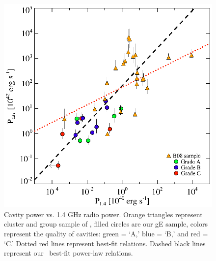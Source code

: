 \documentclass[letterpaper,12pt]{article}
\begin{document}
\begin{figure}[t]
\begin{minipage}[t]{0.5\linewidth}
        \includegraphics*[width=\textwidth, trim=30mm 5mm 40mm 15mm, clip]{pjet.eps}
        \caption{\footnotesize Cavity power vs. 1.4 GHz radio
          power. Orange triangles represent cluster and group sample
          of \cite{birzan08}, filled circles are our gE sample, colors
          represent the quality of cavities: green = `A,' blue = `B,'
          and red = `C.' Dotted red lines represent \cite{birzan08}
          best-fit relations. Dashed black lines represent our
          \bces\ best-fit power-law relations.}
        \label{fig:k0hist}
    \end{minipage}
\end{figure}
 
\end{document}

